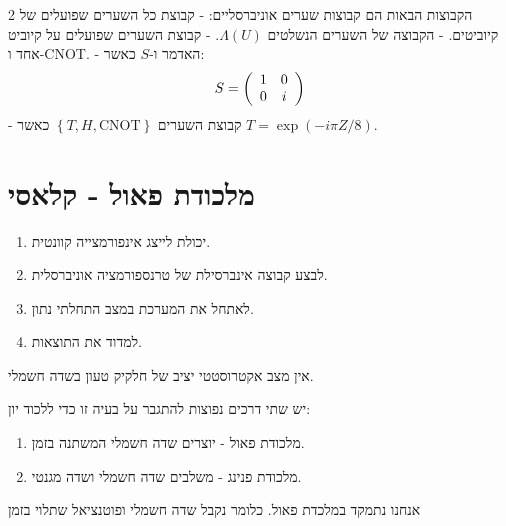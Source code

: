 \documentclass{tstextbook}
\begin{document}
\begin{summary}
הקבוצות הבאות הם קבוצות שערים אוניברסליים:
- קבוצת כל השערים שפועלים של 2 קיוביטים.
- הקבוצה של השערים הנשלטים \(\Lambda(U)\).
- קבוצת השערים שפועלים על קיוביט אחד ו-CNOT.
- האדמר ו-\(S\) כאשר:
$$S=\left(\begin{array}{c c}{{1}}&{{0}}\\ {{0}}&{{i}}\end{array}\right)$$
- קבוצת השערים \(\left\{  T,H,\mathrm{CNOT}  \right\}\) כאשר \(T=\exp\left(-i\pi Z/8\right)\).

\end{summary}

\section{מלכודת פאול - קלאסי}

\begin{reminder}
  \begin{enumerate}
    \item יכולת לייצג אינפורמצייה קוונטית. 


    \item לבצע קבוצה אינברסילת של טרנספורמציה אוניברסלית. 


    \item לאתחל את המערכת במצב התחלתי נתון. 


    \item למדוד את התוצאות. 


  \end{enumerate}
\end{reminder}
\begin{reminder}
אין מצב אקטרוסטטי יציב של חלקיק טעון בשדה חשמלי.

\end{reminder}
\begin{proposition}
יש שתי דרכים נפוצות להתגבר על בעיה זו כדי ללכוד יון:

  \begin{enumerate}
    \item מלכודת פאול - יוצרים שדה חשמלי המשתנה בזמן. 


    \item מלכודת פנינג - משלבים שדה חשמלי ושדה מגנטי. 


  \end{enumerate}
\end{proposition}
אנחנו נתמקד במלכדת פאול. כלומר נקבל שדה חשמלי ופוטנציאל שתלוי בזמן
\end{document}
